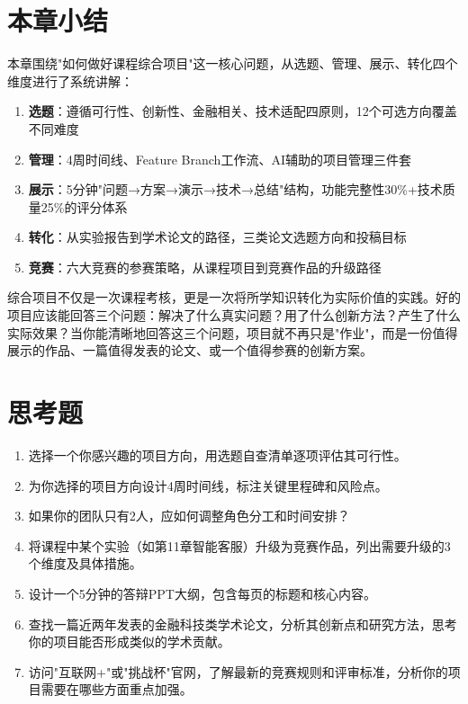 \section{本章小结}

本章围绕"如何做好课程综合项目"这一核心问题，从选题、管理、展示、转化四个维度进行了系统讲解：

\begin{enumerate}[leftmargin=2em]
  \item \textbf{选题}：遵循可行性、创新性、金融相关、技术适配四原则，12个可选方向覆盖不同难度
  \item \textbf{管理}：4周时间线、Feature Branch工作流、AI辅助的项目管理三件套
  \item \textbf{展示}：5分钟"问题→方案→演示→技术→总结"结构，功能完整性30\%+技术质量25\%的评分体系
  \item \textbf{转化}：从实验报告到学术论文的路径，三类论文选题方向和投稿目标
  \item \textbf{竞赛}：六大竞赛的参赛策略，从课程项目到竞赛作品的升级路径
\end{enumerate}

\begin{theorybox}
综合项目不仅是一次课程考核，更是一次将所学知识转化为实际价值的实践。好的项目应该能回答三个问题：解决了什么真实问题？用了什么创新方法？产生了什么实际效果？当你能清晰地回答这三个问题，项目就不再只是"作业"，而是一份值得展示的作品、一篇值得发表的论文、或一个值得参赛的创新方案。
\end{theorybox}

\section{思考题}

\begin{exercisebox}[本章思考题]
\begin{enumerate}[leftmargin=2em]
  \item 选择一个你感兴趣的项目方向，用选题自查清单逐项评估其可行性。
  \item 为你选择的项目方向设计4周时间线，标注关键里程碑和风险点。
  \item 如果你的团队只有2人，应如何调整角色分工和时间安排？
  \item 将课程中某个实验（如第11章智能客服）升级为竞赛作品，列出需要升级的3个维度及具体措施。
  \item 设计一个5分钟的答辩PPT大纲，包含每页的标题和核心内容。
  \item 查找一篇近两年发表的金融科技类学术论文，分析其创新点和研究方法，思考你的项目能否形成类似的学术贡献。
  \item 访问"互联网+"或"挑战杯"官网，了解最新的竞赛规则和评审标准，分析你的项目需要在哪些方面重点加强。
\end{enumerate}
\end{exercisebox}
